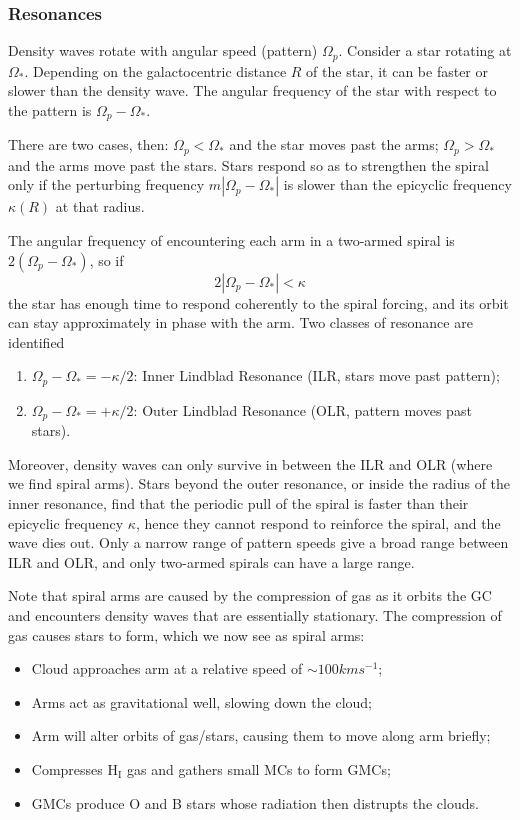 \subsubsection*{Resonances}

Density waves rotate with angular speed (pattern) $\Omega_{p}$. Consider a star rotating at $\Omega_{*}$. Depending on the galactocentric distance $R$ of the star, it can be faster or slower than the density wave. The angular frequency of the star with respect to the pattern is $\Omega_{p}-\Omega_{*}$.
\par There are two cases, then: $\Omega_{p}<\Omega_{*}$ and the star moves past the arms; $\Omega_{p}>\Omega_{*}$ and the arms move past the stars. Stars respond so as to strengthen the spiral only if the perturbing frequency $m|\Omega_{p}-\Omega_{*}|$ is slower than the epicyclic frequency $\kappa(R)$ at that radius.
\par The angular frequency of encountering each arm in a two-armed spiral is $2(\Omega_{p}-\Omega_{*})$, so if 
\begin{equation*}
    2|\Omega_{p}-\Omega_{*}| < \kappa 
\end{equation*}
the star has enough time to respond coherently to the spiral forcing, and its orbit can stay approximately in phase with the arm. Two classes of resonance are identified
\begin{enumerate}
    \item $\Omega_{p}-\Omega_{*} = -\kappa/2$: Inner Lindblad Resonance (ILR, stars move past pattern);
    \item $\Omega_{p}-\Omega_{*} = +\kappa/2$: Outer Lindblad Resonance (OLR, pattern moves past stars).
\end{enumerate}
Moreover, density waves can only survive in between the ILR and OLR (where we find spiral arms). Stars beyond the outer resonance, or inside the radius of the inner resonance, find that the periodic pull of the spiral is faster than their epicyclic frequency $\kappa$, hence they cannot respond to reinforce the spiral, and the wave dies out. Only a narrow range of pattern speeds give a broad range between ILR and OLR, and only two-armed spirals can have a large range.
\par Note that spiral arms are caused by the compression of gas as it orbits the GC and encounters density waves that are essentially stationary. The compression of gas causes stars to form, which we now see as spiral arms:
\begin{itemize}
    \item Cloud approaches arm at a relative speed of $\sim 100\unit{km}\unit{s}^{-1}$;
    \item Arms act as gravitational well, slowing down the cloud;
    \item Arm will alter orbits of gas/stars, causing them to move along arm briefly;
    \item Compresses H$_\text{I}$ gas and gathers small MCs to form GMCs;
    \item GMCs produce O and B stars whose radiation then distrupts the clouds.
\end{itemize}
